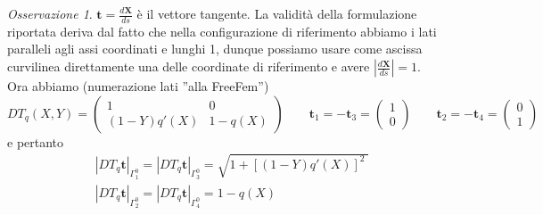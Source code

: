 \documentclass[a4paper,11pt]{article}
\theoremstyle{remark}
\newtheorem{oss}{Osservazione}
\begin{document}
\begin{oss}
 $\mathbf{t}=\frac{d\mathbf{X}}{ds}$ \`e il vettore tangente. La validit\`a della formulazione riportata deriva dal fatto che nella configurazione di riferimento abbiamo i lati paralleli agli assi coordinati e lunghi 1, dunque possiamo usare come ascissa curvilinea direttamente una delle coordinate di riferimento e avere $\left|\frac{d\mathbf{X}}{ds}\right|=1$.\\
 Ora abbiamo (numerazione lati ''alla FreeFem'')
 $$DT_q(X,Y)=
  \begin{pmatrix}
   1 & 0 \\ (1-Y)q'(X) & 1-q(X)
  \end{pmatrix}
  \qquad \mathbf{t}_1=-\mathbf{t}_3=
  \begin{pmatrix}
   1 \\ 0
  \end{pmatrix}
  \qquad \mathbf{t}_2=-\mathbf{t}_4=
  \begin{pmatrix}
   0 \\ 1
  \end{pmatrix}
  $$
 e pertanto
 \begin{gather*}
   |DT_q\mathbf{t}|_{\Gamma^0_1}=|DT_q\mathbf{t}|_{\Gamma^0_3}=\sqrt{1+[(1-Y)q'(X)]^2\ } \\
   |DT_q\mathbf{t}|_{\Gamma^0_2}=|DT_q\mathbf{t}|_{\Gamma^0_4}=1-q(X)
 \end{gather*}


\end{oss}
\end{document}
